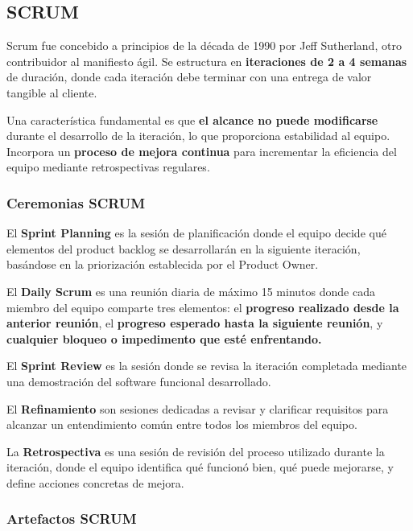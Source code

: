     \subsection{SCRUM}\label{subsec:scrum}

    Scrum fue concebido a principios de la década de 1990 por Jeff Sutherland, otro contribuidor al manifiesto ágil.
    Se estructura en \textbf{iteraciones de 2 a 4 semanas} de duración, donde cada iteración debe terminar con una entrega de valor tangible al cliente.

    Una característica fundamental es que \textbf{el alcance no puede modificarse} durante el desarrollo de la iteración, lo que proporciona estabilidad al equipo.
    Incorpora un \textbf{proceso de mejora continua} para incrementar la eficiencia del equipo mediante retrospectivas regulares.


    \subsubsection{Ceremonias SCRUM}

    El \textbf{Sprint Planning} es la sesión de planificación donde el equipo decide qué elementos del product backlog se desarrollarán en la siguiente iteración, basándose en la priorización establecida por el Product Owner.

    El \textbf{Daily Scrum} es una reunión diaria de máximo 15 minutos donde cada miembro del equipo comparte tres elementos: el \textbf{progreso realizado desde la anterior reunión}, el \textbf{progreso esperado hasta la siguiente reunión}, y \textbf{cualquier bloqueo o impedimento que esté enfrentando.}

    El \textbf{Sprint Review} es la sesión donde se revisa la iteración completada mediante una demostración del software funcional desarrollado.

    El \textbf{Refinamiento} son sesiones dedicadas a revisar y clarificar requisitos para alcanzar un entendimiento común entre todos los miembros del equipo.

    La \textbf{Retrospectiva} es una sesión de revisión del proceso utilizado durante la iteración, donde el equipo identifica qué funcionó bien, qué puede mejorarse, y define acciones concretas de mejora.



    \subsubsection{Artefactos SCRUM}

